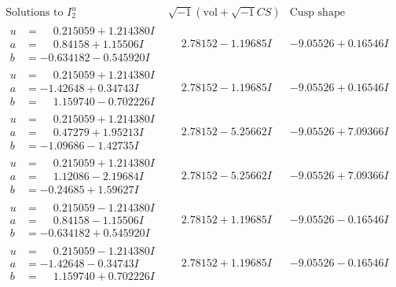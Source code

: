 \documentclass[1p]{elsarticle_modified}
\theoremstyle{definition}
\newcommand{\I}{\sqrt{-1}}
\begin{document}
$$\begin{array}{c|c|c}  
\text{Solutions to }I^u_{2}& \I (\text{vol} + \sqrt{-1}CS) & \text{Cusp shape}\\
 \hline 
\begin{aligned}
u &= \phantom{-}0.215059 + 1.214380 I \\
a &= \phantom{-}0.84158 + 1.15506 I \\
b &= -0.634182 - 0.545920 I\end{aligned}
 & \phantom{-}2.78152 - 1.19685 I & -9.05526 + 0.16546 I \\ \hline\begin{aligned}
u &= \phantom{-}0.215059 + 1.214380 I \\
a &= -1.42648 + 0.34743 I \\
b &= \phantom{-}1.159740 - 0.702226 I\end{aligned}
 & \phantom{-}2.78152 - 1.19685 I & -9.05526 + 0.16546 I \\ \hline\begin{aligned}
u &= \phantom{-}0.215059 + 1.214380 I \\
a &= \phantom{-}0.47279 + 1.95213 I \\
b &= -1.09686 - 1.42735 I\end{aligned}
 & \phantom{-}2.78152 - 5.25662 I & -9.05526 + 7.09366 I \\ \hline\begin{aligned}
u &= \phantom{-}0.215059 + 1.214380 I \\
a &= \phantom{-}1.12086 - 2.19684 I \\
b &= -0.24685 + 1.59627 I\end{aligned}
 & \phantom{-}2.78152 - 5.25662 I & -9.05526 + 7.09366 I \\ \hline\begin{aligned}
u &= \phantom{-}0.215059 - 1.214380 I \\
a &= \phantom{-}0.84158 - 1.15506 I \\
b &= -0.634182 + 0.545920 I\end{aligned}
 & \phantom{-}2.78152 + 1.19685 I & -9.05526 - 0.16546 I \\ \hline\begin{aligned}
u &= \phantom{-}0.215059 - 1.214380 I \\
a &= -1.42648 - 0.34743 I \\
b &= \phantom{-}1.159740 + 0.702226 I\end{aligned}
 & \phantom{-}2.78152 + 1.19685 I & -9.05526 - 0.16546 I \\ \hline\begin{aligned}

\end{aligned}
\end{array}$$
\end{document}
